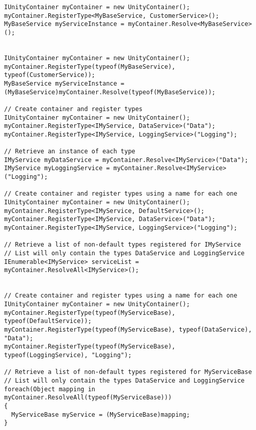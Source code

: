\documentclass[a4paper,10pt]{scrreprt}
\begin{document}
\begin{lstlisting}[caption=Unity Example]
 IUnityContainer myContainer = new UnityContainer();
myContainer.RegisterType<MyBaseService, CustomerService>();
MyBaseService myServiceInstance = myContainer.Resolve<MyBaseService>();


IUnityContainer myContainer = new UnityContainer();
myContainer.RegisterType(typeof(MyBaseService), typeof(CustomerService));
MyBaseService myServiceInstance = (MyBaseService)myContainer.Resolve(typeof(MyBaseService));

// Create container and register types
IUnityContainer myContainer = new UnityContainer();
myContainer.RegisterType<IMyService, DataService>("Data");
myContainer.RegisterType<IMyService, LoggingService>("Logging");

// Retrieve an instance of each type
IMyService myDataService = myContainer.Resolve<IMyService>("Data");
IMyService myLoggingService = myContainer.Resolve<IMyService>("Logging");

// Create container and register types using a name for each one
IUnityContainer myContainer = new UnityContainer();
myContainer.RegisterType<IMyService, DefaultService>();
myContainer.RegisterType<IMyService, DataService>("Data");
myContainer.RegisterType<IMyService, LoggingService>("Logging");

// Retrieve a list of non-default types registered for IMyService
// List will only contain the types DataService and LoggingService
IEnumerable<IMyService> serviceList = myContainer.ResolveAll<IMyService>();


// Create container and register types using a name for each one
IUnityContainer myContainer = new UnityContainer();
myContainer.RegisterType(typeof(MyServiceBase), typeof(DefaultService));
myContainer.RegisterType(typeof(MyServiceBase), typeof(DataService), "Data");
myContainer.RegisterType(typeof(MyServiceBase), typeof(LoggingService), "Logging");

// Retrieve a list of non-default types registered for MyServiceBase
// List will only contain the types DataService and LoggingService
foreach(Object mapping in myContainer.ResolveAll(typeof(MyServiceBase)))
{
  MyServiceBase myService = (MyServiceBase)mapping;
}


\end{lstlisting}
\end{document}
